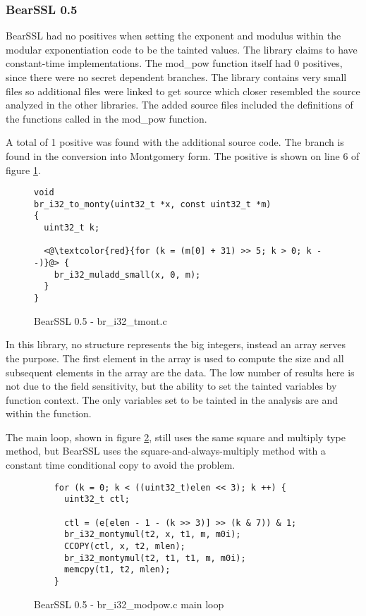 \subsubsection{BearSSL 0.5}
BearSSL had no positives when setting the exponent and modulus within the
modular exponentiation code to be the tainted values. The library claims to have
constant-time implementations\cite{BearSSLweb}. The mod\_pow function itself had 0 positives,
since there were no secret dependent branches. The library contains very small
files so additional files were linked to get source which closer resembled the
source analyzed in the other libraries. The added source files included the
definitions of the functions called in the mod\_pow function.

A total of 1 positive was found with the additional source code. The branch is
found in the conversion into Montgomery form. The positive is shown on line 6 of
figure \ref{code:bear-tmont}.

\begin{figure}
  \begin{lstlisting}
void
br_i32_to_monty(uint32_t *x, const uint32_t *m)
{
  uint32_t k;

  <@\textcolor{red}{for (k = (m[0] + 31) >> 5; k > 0; k --)}@> {
    br_i32_muladd_small(x, 0, m);
  }
}
  \end{lstlisting}
  \caption{BearSSL 0.5 - br\_i32\_tmont.c}
  \label{code:bear-tmont}
\end{figure}

In this library, no structure represents the big integers, instead an array
serves the purpose. The first element in the array is used to compute the size
and all subsequent elements in the array are the data. The low number of results
here is not due to the field sensitivity, but the ability to set the tainted
variables by function context. The only variables set to be tainted in the
analysis are  and  within the 
function.

The main loop, shown in figure \ref{bearssl:mainloop}, still uses the same square and multiply type method, but
BearSSL uses the square-and-always-multiply method with a constant time
conditional copy to avoid the problem.

\begin{figure}[!htpb]
  \begin{lstlisting}
    for (k = 0; k < ((uint32_t)elen << 3); k ++) {
      uint32_t ctl;

      ctl = (e[elen - 1 - (k >> 3)] >> (k & 7)) & 1;
      br_i32_montymul(t2, x, t1, m, m0i);
      CCOPY(ctl, x, t2, mlen);
      br_i32_montymul(t2, t1, t1, m, m0i);
      memcpy(t1, t2, mlen);
    }
\end{lstlisting}
\caption{BearSSL 0.5 - br\_i32\_modpow.c main loop}
\label{bearssl:mainloop}
\end{figure}


